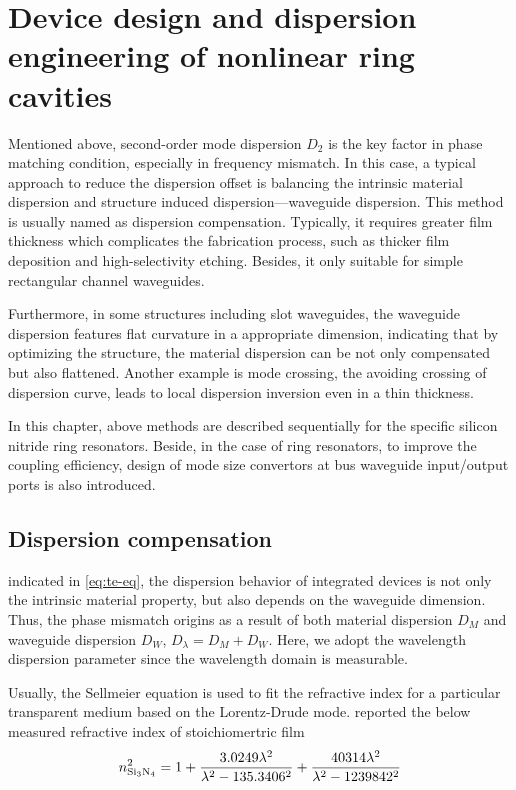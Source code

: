 
\chapter{Device design and dispersion engineering of nonlinear ring cavities}

Mentioned above, %
second-order mode dispersion $ D_2 $ is the key factor in phase matching condition, especially in frequency mismatch. In this case, a typical approach to reduce the dispersion offset is balancing the intrinsic material dispersion and structure induced dispersion---waveguide dispersion. This method is usually named as dispersion compensation. Typically, it requires greater film thickness which complicates the fabrication process, such as thicker film deposition and high-selectivity etching. Besides, it only suitable for simple rectangular channel waveguides.

Furthermore, in some structures including slot waveguides, the waveguide dispersion features flat curvature in a appropriate dimension, indicating that by optimizing the structure, the material dispersion can be not only compensated but also flattened. Another example is mode crossing, the avoiding crossing of dispersion curve, leads to local dispersion inversion even in a thin thickness. 

In this chapter, above methods are described sequentially for the specific silicon nitride ring resonators. Beside, in the case of ring resonators, to improve the coupling efficiency, design of mode size convertors at bus waveguide input/output ports is also introduced.

\section{Dispersion compensation}\label{sec:disp-comp}
indicated in \autoref{eq:te-eq}, the dispersion behavior of integrated devices is not only the intrinsic material property, but also depends on the waveguide dimension. Thus, the phase mismatch origins as a result of both material dispersion $D_M$ and waveguide dispersion $ D_W $, $D_{\lambda}= D_M + D_W$. Here, we adopt the wavelength dispersion parameter since the wavelength domain is measurable.

Usually, the Sellmeier equation is used to fit the refractive index for a particular transparent medium based on the Lorentz-Drude mode. \citeauthor{Luke2015a} reported the below measured refractive index of stoichiomertric  film \cite{Luke2015a}
\begin{equation}\label{eq:si3n4-selleimeier}
    n_{\ce{Si3N4}}^2 = 1 + \frac{3.0249 \lambda^2}{\lambda^2-135.3406^2} + \frac{40314 \lambda^2}{\lambda^2 - 1239842^2}
\end{equation}

